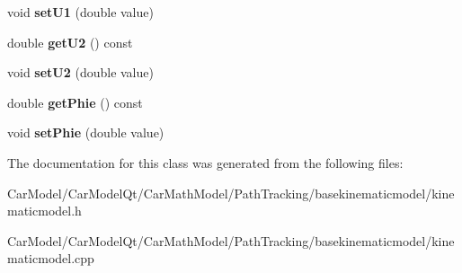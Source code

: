 \begin{DoxyCompactItemize}
void {\bfseries set\+U1} (double value)
\item 
\mbox{\label{class_path_1_1_kinematic_models_1_1_kinematic_model_a4d41edca86841bbace00ae577dc8f524}} 
double {\bfseries get\+U2} () const
\item 
\mbox{\label{class_path_1_1_kinematic_models_1_1_kinematic_model_a1be6902520ab6ae8ac53fd98344e7cc9}} 
void {\bfseries set\+U2} (double value)
\item 
\mbox{\label{class_path_1_1_kinematic_models_1_1_kinematic_model_aa00779de34c5c6fe2d3b1ef91544ff09}} 
double {\bfseries get\+Phie} () const
\item 
\mbox{\label{class_path_1_1_kinematic_models_1_1_kinematic_model_a900c3ce6d136bc414893d486bb4480b9}} 
void {\bfseries set\+Phie} (double value)
\end{DoxyCompactItemize}


The documentation for this class was generated from the following files\+:\begin{DoxyCompactItemize}
\item 
Car\+Model/\+Car\+Model\+Qt/\+Car\+Math\+Model/\+Path\+Tracking/basekinematicmodel/kinematicmodel.\+h\item 
Car\+Model/\+Car\+Model\+Qt/\+Car\+Math\+Model/\+Path\+Tracking/basekinematicmodel/kinematicmodel.\+cpp\end{DoxyCompactItemize}
